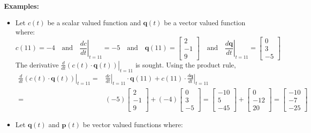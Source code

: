 \documentclass{article}
\begin{document}
\textbf{Examples:}
\begin{itemize}
\item Let \(c(t)\) be a scalar valued function and \(\mathbf{q}(t)\) be a vector valued function where: 
\[c(11) = -4 \quad\text{and}\quad \left.\frac{dc}{dt}\right|_{t = 11} = -5 \quad\text{and}\quad \mathbf{q}(11) = \begin{bmatrix} 2 \\ -1 \\ 9 \end{bmatrix} \quad\text{and}\quad \left.\frac{d\mathbf{q}}{dt}\right|_{t = 11} = \begin{bmatrix} 0 \\ 3 \\ -5 \end{bmatrix}\]  
The derivative \(\left.\frac{d}{dt}(c(t) \cdot \mathbf{q}(t))\right|_{t = 11}\) is sought. Using the product rule, 
\begin{align*}
\left.\frac{d}{dt}(c(t) \cdot \mathbf{q}(t))\right|_{t = 11} = & \left.\frac{dc}{dt}\right|_{t = 11} \cdot \mathbf{q}(11) + c(11) \cdot \left.\frac{d\mathbf{q}}{dt}\right|_{t = 11} \\   
= & (-5)\begin{bmatrix} 2 \\ -1 \\ 9 \end{bmatrix} + (-4)\begin{bmatrix} 0 \\ 3 \\ -5 \end{bmatrix}  
= \begin{bmatrix} -10 \\ 5 \\ -45 \end{bmatrix} + \begin{bmatrix} 0 \\ -12 \\ 20 \end{bmatrix} 
= \begin{bmatrix} -10 \\ -7 \\ -25 \end{bmatrix}
\end{align*}
\item Let \(\mathbf{q}(t)\) and \(\mathbf{p}(t)\) be vector valued functions where: 

\end{itemize}
\end{document}
